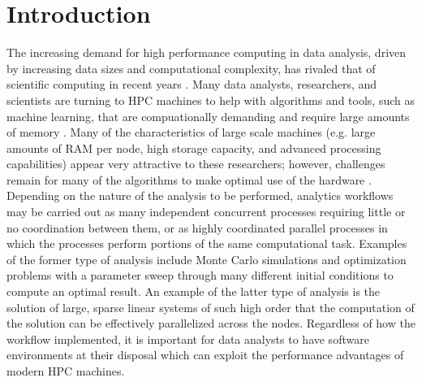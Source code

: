 \graphicspath{{plots/}}
\section{Introduction}

The increasing demand for high performance computing in data analysis, driven by
increasing data sizes and computational complexity, has rivaled that of scientific
computing in recent years \cite{fox:bdBenchmarking, kouzes:paradigm}. Many data analysts,
researchers, and scientists are turning to HPC machines to help with algorithms and tools,
such as machine learning, that are compuationally demanding and require large amounts of
memory \cite{raj:hpcBigData}. Many of the characteristics of large scale machines (e.g.
large amounts of RAM per node, high storage capacity, and advanced processing
capabilities) appear very attractive to these researchers; however, challenges remain for
many of the algorithms to make optimal use of the hardware \cite{lee:model}. Depending on
the nature of the analysis to be performed, analytics workflows may be carried out as many
independent concurrent processes requiring little or no coordination between them, or as
highly coordinated parallel processes in which the processes perform portions of the same
computational task. Examples of the former type of analysis include Monte Carlo
simulations and optimization problems with a parameter sweep through many different
initial conditions to compute an optimal result.  An example of the latter type of
analysis is the solution of large, sparse linear systems of such high order that the
computation of the solution can be effectively parallelized across the nodes.
Regardless of how the workflow implemented, it is important for data analysts to have
software environments at their disposal which can exploit the performance advantages of
modern HPC machines.

